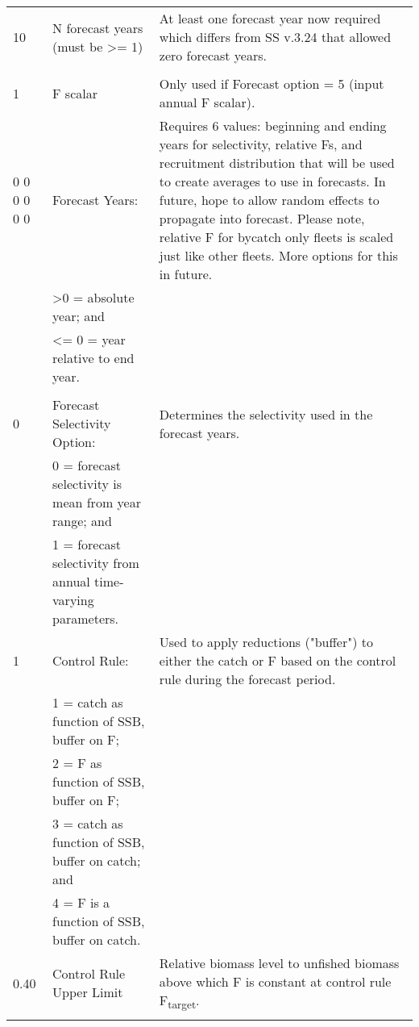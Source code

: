\begin{landscape}
{\begin{longtable}{p{3.2cm} p{7cm} p{10.8cm}}
  \hline
  10 & N forecast years (must be >= 1) &  \multirow{1}{1cm}[-0.25cm]{\parbox{11cm }{ At least one forecast year now required which differs from SS v.3.24 that allowed zero forecast years.}} \Tstrut\\
     & & \Bstrut\\
     
  \hline
  1 & F scalar & \multirow{1}{1cm}[-0.10cm]{\parbox{11cm}{Only used if Forecast option = 5 (input annual F scalar).}}\Tstrut\Bstrut\\
  
  \hline
  0 0 0 0 0 0 & Forecast Years: &  \multirow{1}{1cm}[-0.25cm]{\parbox{11cm}{Requires 6 values: beginning and ending years for selectivity, relative Fs, and recruitment distribution that will be used to create averages to use in forecasts.  In future, hope to allow random effects to propagate into forecast. Please note, relative F for bycatch only fleets is scaled just like other fleets.  More options for this in future.}}\Tstrut\\
    & >0 = absolute year; and & \\
    & <= 0 = year relative to end year. & \\
    & & \Bstrut\\  

 \pagebreak   
 0 & Forecast Selectivity Option: & Determines the selectivity used in the forecast years. \Tstrut\\
   & 0 = forecast selectivity is mean from year range; and & \\
   & 1 = forecast selectivity from annual time-varying parameters. & \Bstrut\\

 \hline   
 1 & Control Rule: & \multirow{1}{1cm}[-0.25cm]{\parbox{11cm}{Used to apply reductions ("buffer") to either the catch or F based on the control rule during the forecast period.}} \Tstrut\\
   & 1 = catch as function of SSB, buffer on F; & \\
   & 2 = F as function of SSB, buffer on F; & \\
   & 3 = catch as function of SSB, buffer on catch; and & \\
   & 4 = F is a function of SSB, buffer on catch. & \Bstrut\\
 \hline
 
 0.40 \Tstrut & Control Rule Upper Limit & \multirow{1}{1cm}[-0.25cm]{\parbox{11cm}{Relative biomass level to unfished biomass above which F is constant at control rule F\textsubscript{target}.}} \\
   &  & \Bstrut\\
 

\end{longtable}}
\end{landscape}
